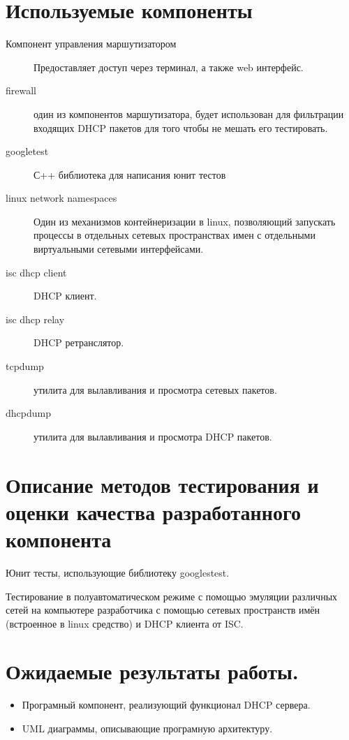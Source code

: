 \documentclass[12pt]{article}
\begin{document}
\section{Используемые компоненты}
\begin{description}
    \item[Компонент управления маршутизатором] Предоставляет доступ через терминал, а также web интерфейс.
    \item[firewall] один из компонентов маршутизатора, будет использован для фильтрации входящих DHCP пакетов для того чтобы не мешать его тестировать.
    \item[googletest] С++ библиотека для написания юнит тестов
    \item[linux network namespaces] Один из механизмов контейнеризации в linux, позволяющий запускать процессы в отдельных сетевых пространствах имен с отдельными виртуальными сетевыми интерфейсами.
    \item[isc dhcp client] DHCP клиент.
    \item[isc dhcp relay] DHCP ретранслятор.
    \item[ tcpdump] утилита для вылавливания и просмотра сетевых пакетов.
    \item[dhcpdump] утилита для вылавливания и просмотра DHCP пакетов.
\end{description}

\section{Описание методов тестирования и оценки качества разработанного компонента}
Юнит тесты, использующие библиотеку googlestest.

Тестирование в полуавтоматическом режиме с помощью эмуляции различных сетей на компьютере разработчика с помощью сетевых пространств имён (встроенное в linux средство) и DHCP клиента от ISC.

\section{Ожидаемые результаты работы.}
\begin{itemize}
    \item Програмный компонент, реализующий функционал DHCP сервера.
    \item UML диаграммы, описывающие програмную архитектуру.
\end{itemize}
\end{document}
